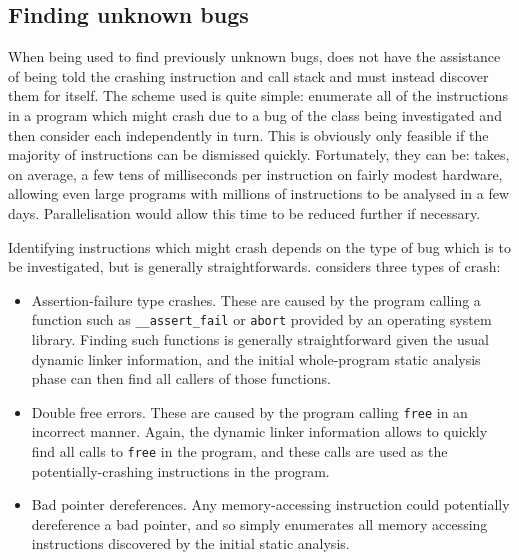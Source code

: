 \subsection{Finding unknown bugs}
\label{sect:derive:unknown_bugs}


When being used to find previously unknown bugs, {\technique} does not
have the assistance of being told the crashing instruction and call
stack and must instead discover them for itself.  The scheme used is
quite simple: enumerate all of the instructions in a program which
might crash due to a bug of the class being investigated and then
consider each independently in turn.  This is obviously only feasible
if the majority of instructions can be dismissed quickly.
Fortunately, they can be: {\implementation} takes, on average, a few
tens of milliseconds per instruction on fairly modest hardware,
allowing even large programs with millions of instructions to be
analysed in a few days.
Parallelisation would allow this time to be reduced further if
necessary.

Identifying instructions which might crash depends on the type of bug
which is to be investigated, but is generally straightforwards.
{\Implementation} considers three types of crash:

\begin{itemize}
\item Assertion-failure type crashes.  These are caused by the program
  calling a function such as \verb|__assert_fail| or \verb|abort|
  provided by an operating system library.  Finding such functions is
  generally straightforward given the usual dynamic linker
  information, and the initial whole-program static analysis phase can
  then find all callers of those functions.
\item Double free errors.  These are caused by the program calling
  \verb|free| in an incorrect manner.  Again, the dynamic linker
  information allows {\implementation} to quickly find all calls to
  \verb|free| in the program, and these calls are used as the
  potentially-crashing instructions in the program.
\item Bad pointer dereferences.  Any memory-accessing instruction
  could potentially dereference a bad pointer, and so
  {\implementation} simply enumerates all memory accessing
  instructions discovered by the initial static analysis.
\end{itemize}

